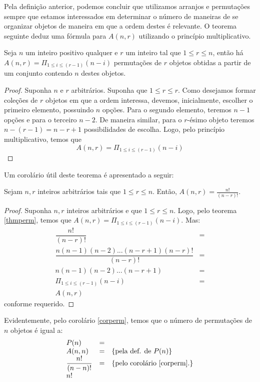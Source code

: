 Pela definição anterior, podemos concluir que utilizamos arranjos e
permutações sempre que estamos interessados em determinar o número de
maneiras de se organizar objetos de maneira em que a ordem destes é
relevante. O teorema seguinte deduz uma fórmula para $A(n,r)$
utilizando o princípio multiplicativo.

\begin{Theorem}\label{thmperm}
Seja $n$ um inteiro positivo qualquer e $r$ um inteiro tal que $1 \leq
r \leq n$, então há $A(n,r) = \Pi_{1 \leq i \leq (r - 1)}(n - i)$
permutações de $r$ objetos obtidas a partir de um conjunto contendo
$n$ destes objetos.
\end{Theorem}
\begin{proof}
Suponha $n$ e $r$ arbitrários. Suponha que $1 \leq r \leq r$. Como
desejamos formar coleções de $r$ objetos em que a ordem interessa,
devemos, inicialmente, escolher o primeiro elemento, possuindo $n$
opções. Para o segundo elemento, teremos $n -1$ opções e para o
terceiro $n- 2$. De maneira similar, para o $r$-ésimo objeto teremos
$n - (r - 1) = n -r + 1$ possibilidades de escolha. Logo, pelo
princípio multiplicativo, temos que
\[
    A(n,r) = \displaystyle{\Pi_{1 \leq i \leq (r - 1)}(n - i)}
\]
\end{proof}

Um corolário útil deste teorema é apresentado a seguir:

\begin{Corollary}\label{corperm}
Sejam $n,r$ inteiros arbitrários tais que $1 \leq r \leq n$. Então,
$A(n,r) = \frac{n!}{(n - r)!}$.
\end{Corollary}
\begin{proof}
Suponha $n,r$ inteiros arbitrários e que $1 \leq r \leq n$. Logo, pelo
teorema \ref{thmperm}, temos que $A(n,r) = \Pi_{1 \leq i \leq (r -
  1)}(n - i)$. Mas:
\[
\begin{array}{lc}
\dfrac{n!}{(n - r)!} & = \\
\dfrac{n(n-1)(n-2) ... (n- r + 1) (n - r)!}{(n - r)!} & = \\
n(n - 1)(n-2) ... (n - r + 1) & = \\
\Pi_{1 \leq i \leq (r - 1)}(n - i) & = \\
A(n,r)
\end{array}
\]
conforme requerido.
\end{proof}
Evidentemente, pelo corolário \ref{corperm}, temos que o número de
permutações de $n$ objetos é igual a:
\[
\begin{array}{lcl}
P(n) & = &\\
A(n,n) & = &\{\text{pela def. de }P(n)\}\\
\dfrac{n!}{(n - n)!} & = & \{\text{pelo corolário \ref{corperm}.}\}\\
n!
\end{array}
\]


